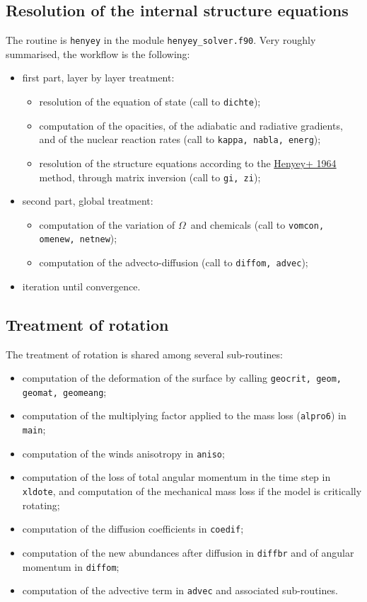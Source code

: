 \documentclass[11pt]{article}
\def\om{\ensuremath{\Omega}}
\def\itembb{\item[\ \ \ \textbullet]}
\def\itemb{\item[\ \ \ \textopenbullet]}
\begin{document}
\subsection{Resolution of the internal structure equations}
The routine is \texttt{henyey} in the module \texttt{henyey\_solver.f90}. Very roughly summarised, the workflow is the following:
\begin{itemize}
 \itembb first part, layer by layer treatment:
  \begin{itemize}
   \itemb resolution of the equation of state (call to \texttt{dichte});
   \itemb computation of the opacities, of the adiabatic and radiative gradients, and of the nuclear reaction rates (call to \texttt{kappa, nabla, energ});
   \itemb resolution of the structure equations according to the \href{https://ui.adsabs.harvard.edu/abs/1964ApJ...139..306H}{Henyey+ 1964} method, through matrix inversion (call to \texttt{gi, zi});
  \end{itemize}
 \itembb second part, global treatment:
  \begin{itemize}
   \itemb computation of the variation of \om\ and chemicals (call to \texttt{vomcon, omenew, netnew});
   \itemb computation of the advecto-diffusion (call to \texttt{diffom, advec});
  \end{itemize}
 \itembb iteration until convergence.
\end{itemize}

\subsection{Treatment of rotation}
The treatment of rotation is shared among several sub-routines:
\begin{itemize}
 \itembb computation of the deformation of the surface by calling \texttt{geocrit, geom, geomat, geomeang};
 \itembb computation of the multiplying factor applied to the mass loss (\texttt{alpro6}) in \texttt{main};
 \itembb computation of the winds anisotropy in \texttt{aniso};
 \itembb computation of the loss of total angular momentum in the time step in \texttt{xldote}, and computation of the mechanical mass loss if the model is critically rotating;
 \itembb computation of the diffusion coefficients in \texttt{coedif};
 \itembb computation of the new abundances after diffusion in \texttt{diffbr} and of angular momentum in \texttt{diffom};
 \itembb  computation of the advective term in \texttt{advec} and associated sub-routines.
\end{itemize}
\end{document}
